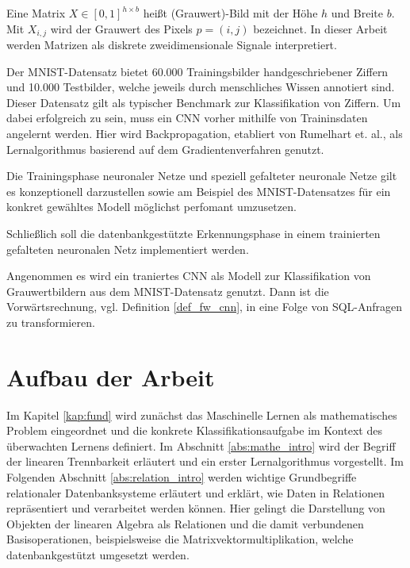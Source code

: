 \begin{defi}
    \label{def:image}
    Eine Matrix $X \in [0,1]^{h \times b}$ heißt (Grauwert)-Bild mit der Höhe $h$ und Breite $b$. Mit $X_{i,j}$ wird der Grauwert des Pixels $p=(i,j)$ bezeichnet. In dieser Arbeit werden Matrizen als diskrete zweidimensionale Signale interpretiert.
\end{defi}
Der MNIST-Datensatz bietet 60.000 Trainingsbilder handgeschriebener Ziffern und 10.000 Testbilder, welche jeweils durch menschliches
Wissen annotiert sind. Dieser Datensatz gilt als typischer Benchmark zur Klassifikation von Ziffern. Um dabei erfolgreich zu sein, muss ein CNN vorher mithilfe von Traininsdaten angelernt werden. Hier wird Backpropagation, etabliert von Rumelhart et. al.\cite{MLPbook}, als Lernalgorithmus basierend auf dem Gradientenverfahren 
genutzt.
\begin{problem}
    \label{prop:train}
    Die Trainingsphase neuronaler Netze und speziell gefalteter neuronale Netze gilt es konzeptionell darzustellen sowie am Beispiel des MNIST-Datensatzes für ein konkret gewähltes Modell möglichst perfomant umzusetzen. 
\end{problem}

Schließlich soll die datenbankgestützte Erkennungsphase in einem trainierten gefalteten neuronalen Netz implementiert werden.

\begin{problem}
    \label{prob:ffCCN}
    Angenommen es wird ein traniertes CNN als Modell zur Klassifikation von Grauwertbildern aus dem MNIST-Datensatz genutzt. Dann ist die Vorwärtsrechnung, vgl. Definition \ref{def_fw_cnn}, in eine Folge von SQL-Anfragen zu transformieren.
\end{problem}

\section*{Aufbau der Arbeit}
\label{abs:glied}
Im Kapitel \ref{kap:fund} wird zunächst das Maschinelle Lernen als mathematisches Problem eingeordnet und die konkrete Klassifikationsaufgabe im Kontext des überwachten Lernens definiert. Im Abschnitt \ref{abs:mathe_intro} wird der Begriff der linearen Trennbarkeit erläutert und ein erster Lernalgorithmus vorgestellt. Im Folgenden Abschnitt \ref{abs:relation_intro} werden wichtige Grundbegriffe relationaler Datenbanksysteme erläutert und erklärt, wie Daten in Relationen repräsentiert und verarbeitet werden können. Hier gelingt die Darstellung von Objekten der linearen Algebra als Relationen und die damit verbundenen Basisoperationen, beispielsweise die Matrixvektormultiplikation, welche datenbankgestützt umgesetzt werden.

